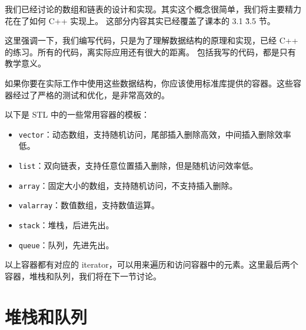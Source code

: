 \documentclass[a4paper]{ctexart}
\theoremstyle{definition}
\theoremstyle{definition}
\begin{document}



我们已经讨论的数组和链表的设计和实现。其实这个概念很简单，我们将主要精力花在了如何 C++ 实现上。
这部分内容其实已经覆盖了课本的 3.1 \~ 3.5 节。

这里强调一下，我们编写代码，只是为了理解数据结构的原理和实现，已经 C++ 的练习。所有的代码，离实际应用还有很大的距离。
包括我写的代码，都是只有教学意义。

如果你要在实际工作中使用这些数据结构，你应该使用标准库提供的容器。这些容器经过了严格的测试和优化，是非常高效的。

以下是 STL 中的一些常用容器的模板：
\begin{itemize}
  \item \verb|vector|：动态数组，支持随机访问，尾部插入删除高效，中间插入删除效率低。
  \item \verb|list|：双向链表，支持任意位置插入删除，但是随机访问效率低。
  \item \verb|array|：固定大小的数组，支持随机访问，不支持插入删除。
  \item \verb|valarray|：数值数组，支持数值运算。
  \item \verb|stack|：堆栈，后进先出。
  \item \verb|queue|：队列，先进先出。
\end{itemize}

以上容器都有对应的 iterator，可以用来遍历和访问容器中的元素。这里最后两个容器，堆栈和队列，我们将在下一节讨论。

\section{堆栈和队列}
\end{document}
